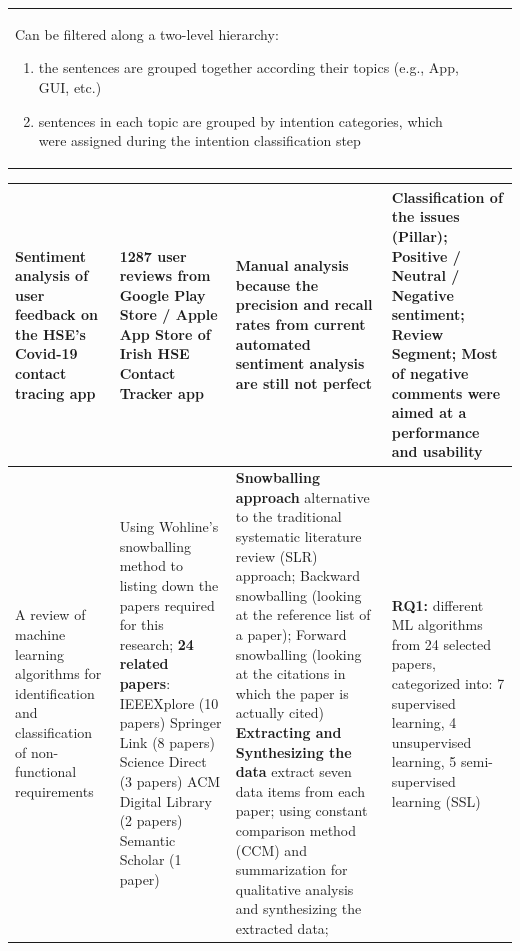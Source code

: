 \documentclass[12pt]{article}
\begin{document}
\begin{table}
\begin{tabular}{|p{2cm}|p{2cm}|p{4cm}|p{5cm}|}
Can be filtered along a two-level hierarchy:
\begin{enumerate}
    \item the sentences are grouped together according their topics (e.g., App, GUI, etc.)
    \item sentences in each topic are grouped by intention categories, which were assigned during the intention classification step
\end{enumerate}
\end{tabular}
\hline
\label{tab:literature_review}
\end{table}


\begin{table}
\begin{tabular}{|p{2cm}|p{2cm}|p{4cm}|p{5cm}|}
\hline
\centering
Sentiment analysis of user feedback on the HSE’s Covid-19 contact tracing app \cite{sentiment_analysis_hse_ireland}
&
1287 user reviews from Google Play Store / Apple App Store of Irish HSE Contact Tracker app
&
Manual analysis because the precision and recall rates from current automated sentiment analysis are still not perfect
&
Classification of the issues (Pillar);
\newline
Positive / Neutral / Negative sentiment;
\newline
Review Segment;
\newline
Most of negative comments were aimed at a performance and usability
\\
\hline
A review of machine learning algorithms for identification and classification of non-functional requirements \cite{review_ml}
&
Using Wohline's snowballing method to listing down the papers required for this research;
\newline\newline
\textbf{24 related papers}:
IEEEXplore (10 papers)\newline
Springer Link (8 papers)\newline 
Science Direct (3 papers)\newline
ACM Digital Library (2 papers)\newline
Semantic Scholar (1 paper)
&
\textbf{Snowballing approach}
alternative to the traditional systematic literature review (SLR) approach;\newline
Backward snowballing (looking at the reference list of a paper);\newline
Forward snowballing (looking at the citations in which the paper is actually cited)\newline\newline
\textbf{Extracting and Synthesizing the data}\newline
extract seven data items from each paper;\newline
using constant comparison method (CCM) and summarization for qualitative analysis and synthesizing the extracted data;
&
\textbf{RQ1:}\newline
16 different ML algorithms from 24 selected papers, categorized into: 7 supervised learning, 4 unsupervised learning, 5 semi-supervised learning (SSL)\newline


\end{tabular}
\end{table}
\end{document}
